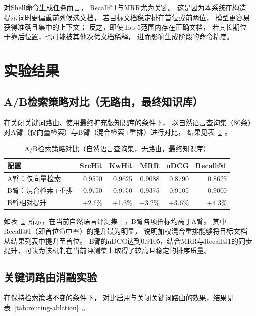 对Shell命令生成任务而言，
Recall@1与MRR尤为关键。
这是因为本系统在构造提示词时更偏重前列候选文档，
若目标文档稳定排在首位或前两位，
模型更容易获得准确且集中的上下文；
反之，即使Top-5范围内存在正确文档，
若其长期位于靠后位置，也可能被其他次优文档稀释，
进而影响生成阶段的命令精度。

\section{实验结果}

\subsection{A/B检索策略对比（无路由，最终知识库）}

在关闭关键词路由、使用最终扩充版知识库的条件下，
以自然语言查询集（80条）对A臂（仅向量检索）与B臂（混合检索+重排）进行对比，
结果见表~\ref{tab:ab-result}~。

\begin{table}[htbp]
\centering
\caption{A/B检索策略对比（自然语言查询集，无路由，最终知识库）}
\label{tab:ab-result}
\begin{tabular}{lrrrrr}
\toprule
配置 & SrcHit & KwHit & MRR & nDCG & Recall@1 \\
\midrule
A臂：仅向量检索 & 0.9500 & 0.9625 & 0.9088 & 0.8790 & 0.8625 \\
B臂：混合检索+重排 & 0.9750 & 0.9750 & 0.9375 & 0.9105 & 0.9000 \\
\midrule
B臂相对提升 & $+$2.6\% & $+$1.3\% & $+$3.2\% & $+$3.6\% & $+$4.3\% \\
\bottomrule
\end{tabular}
\end{table}

如表~\ref{tab:ab-result}~所示，在当前自然语言评测集上，B臂各项指标均高于A臂。
其中Recall@1（即首位命中率）的提升最为明显，
说明加权混合重排能够将目标文档从结果列表中提升至首位。
B臂的nDCG达到0.9105，结合MRR与Recall@1的同步提升，可认为该机制在当前评测集上取得了较高且稳定的排序质量。

\subsection{关键词路由消融实验}

在保持检索策略不变的条件下，
对比启用与关闭关键词路由的效果，结果见表~\ref{tab:routing-ablation}~。

